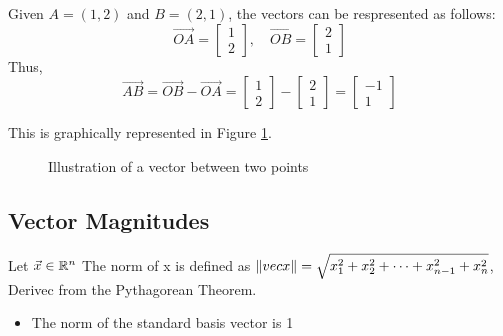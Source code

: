 \documentclass{mlatext}
\begin{document}
\begin{exl}
  Given $A = (1, 2)$ and $B = (2, 1)$, the vectors can be respresented as follows:
  \begin{equation*}
    \vec{OA} = \begin{bmatrix} 1\\2 \end{bmatrix},\quad
    \vec{OB} = \begin{bmatrix} 2\\1 \end{bmatrix}
  \end{equation*}
  Thus,
  \begin{equation*}
    \vec{AB} = \vec{OB} - \vec{OA} = \begin{bmatrix} 1\\2 \end{bmatrix} - \begin{bmatrix} 2\\1 \end{bmatrix} = \begin{bmatrix} -1\\1 \end{bmatrix}
  \end{equation*}

  This is graphically represented in Figure \ref{fig:vec_between_points}.
\end{exl}
\begin{figure}[h]
  \centering
  \caption{Illustration of a vector between two points}
  \label{fig:vec_between_points}
\end{figure}

\subsection{Vector Magnitudes}
\begin{defn}

  Let $\vec{x} \in \mathbb{R}^n$
  The norm of x is defined as $\lVert vec{x} \rVert = \sqrt{x_1^2 + x_2^2 + \cdots + x_{n-1}^2 + x_n^2}$, Derivec from the Pythagorean Theorem.
\end{defn}
\begin{itemize}
\item The norm of the standard basis vector is 1
\end{itemize}
\end{document}
